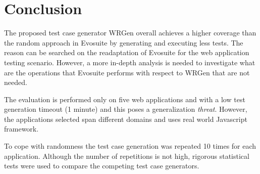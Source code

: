 \chapter{Conclusion}\label{ch:conclusion}
The proposed test case generator WRGen overall achieves a higher coverage than the random approach in Evosuite by generating and executing less tests. The reason can be searched on the readaptation of Evosuite for the web application testing scenario. However, a more in-depth analysis is needed to investigate what are the  operations that Evosuite performs with respect to WRGen that are not needed.



The evaluation is performed only on five web applications and with a low test generation timeout (1 minute) and this poses a generalization \textit{threat}. However, the applications selected span different domains and uses real world Javascript framework.

To cope with randomness the test case generation was repeated 10 times for each application. Although the number of repetitions is not high, rigorous statistical tests were used to compare the competing test case generators. 




